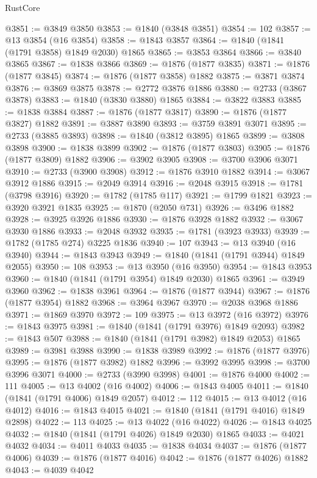 \begin{lexlean}{RustCore}
\begin{coremodule}
@3851 := @3849 @3850
@3853 := @1840 (@3848 @3851)
@3854 := 102
@3857 := @13 @3854 (@16 @3854)
@3858 := @1843 @3857
@3864 := @1840 (@1841 (@1791 @3858) @1849 @2030) @1865
@3865 := @3853 @3864
@3866 := @3840 @3865
@3867 := @1838 @3866
@3869 := @1876 (@1877 @3835)
@3871 := @1876 (@1877 @3845)
@3874 := @1876 (@1877 @3858) @1882
@3875 := @3871 @3874
@3876 := @3869 @3875
@3878 := @2772 @3876 @1886
@3880 := @2733 (@3867 @3878)
@3883 := @1840 (@3830 @3880) @1865
@3884 := @3822 @3883
@3885 := @1838 @3884
@3887 := @1876 (@1877 @3817)
@3890 := @1876 (@1877 @3827) @1882
@3891 := @3887 @3890
@3893 := @3759 @3891 @3071
@3895 := @2733 (@3885 @3893)
@3898 := @1840 (@3812 @3895) @1865
@3899 := @3808 @3898
@3900 := @1838 @3899
@3902 := @1876 (@1877 @3803)
@3905 := @1876 (@1877 @3809) @1882
@3906 := @3902 @3905
@3908 := @3700 @3906 @3071
@3910 := @2733 (@3900 @3908)
@3912 := @1876 @3910 @1882
@3914 := @3067 @3912 @1886
@3915 := @2049 @3914
@3916 := @2048 @3915
@3918 := @1781 (@3798 @3916)
@3920 := @1782 (@1785 @117)
@3921 := @1799 @1821
@3923 := @3920 @3921 @1835
@3925 := @1870 (@2050 @731)
@3926 := @3496 @1882
@3928 := @3925 @3926 @1886
@3930 := @1876 @3928 @1882
@3932 := @3067 @3930 @1886
@3933 := @2048 @3932
@3935 := @1781 (@3923 @3933)
@3939 := @1782 (@1785 @274) @3225 @1836
@3940 := 107
@3943 := @13 @3940 (@16 @3940)
@3944 := @1843 @3943
@3949 := @1840 (@1841 (@1791 @3944) @1849 @2055)
@3950 := 108
@3953 := @13 @3950 (@16 @3950)
@3954 := @1843 @3953
@3960 := @1840 (@1841 (@1791 @3954) @1849 @2030) @1865
@3961 := @3949 @3960
@3962 := @1838 @3961
@3964 := @1876 (@1877 @3944)
@3967 := @1876 (@1877 @3954) @1882
@3968 := @3964 @3967
@3970 := @2038 @3968 @1886
@3971 := @1869 @3970
@3972 := 109
@3975 := @13 @3972 (@16 @3972)
@3976 := @1843 @3975
@3981 := @1840 (@1841 (@1791 @3976) @1849 @2093)
@3982 := @1843 @507
@3988 := @1840 (@1841 (@1791 @3982) @1849 @2053) @1865
@3989 := @3981 @3988
@3990 := @1838 @3989
@3992 := @1876 (@1877 @3976)
@3995 := @1876 (@1877 @3982) @1882
@3996 := @3992 @3995
@3998 := @3700 @3996 @3071
@4000 := @2733 (@3990 @3998)
@4001 := @1876 @4000
@4002 := 111
@4005 := @13 @4002 (@16 @4002)
@4006 := @1843 @4005
@4011 := @1840 (@1841 (@1791 @4006) @1849 @2057)
@4012 := 112
@4015 := @13 @4012 (@16 @4012)
@4016 := @1843 @4015
@4021 := @1840 (@1841 (@1791 @4016) @1849 @2898)
@4022 := 113
@4025 := @13 @4022 (@16 @4022)
@4026 := @1843 @4025
@4032 := @1840 (@1841 (@1791 @4026) @1849 @2030) @1865
@4033 := @4021 @4032
@4034 := @4011 @4033
@4035 := @1838 @4034
@4037 := @1876 (@1877 @4006)
@4039 := @1876 (@1877 @4016)
@4042 := @1876 (@1877 @4026) @1882
@4043 := @4039 @4042

\end{coremodule}
\end{lexlean}
